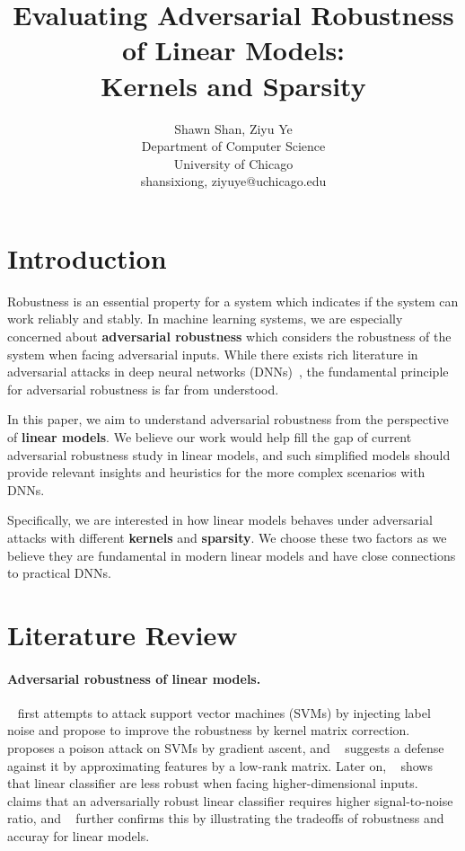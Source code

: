 \documentclass{article}
\title{Evaluating Adversarial Robustness of Linear Models:\\Kernels and Sparsity}
\author{%
  Shawn Shan, Ziyu Ye \\
  Department of Computer Science\\
  University of Chicago\\
  {shansixiong, ziyuye}@uchicago.edu \\
}
\begin{document}
\maketitle


\section{Introduction}
Robustness is an essential property for a system which indicates if the system can work reliably and stably. In machine learning systems, we are especially concerned about \textbf{adversarial robustness} which considers the robustness of the system when facing adversarial inputs. While there exists rich literature in adversarial attacks in deep neural networks (DNNs)~\cite{hao2020adversarial}, the fundamental principle for adversarial robustness is far from understood.

In this paper, we aim to understand adversarial robustness from the perspective of \textbf{linear models}. We believe our work would help fill the gap of current adversarial robustness study in linear models, and such simplified models should provide relevant insights and heuristics for the more complex scenarios with DNNs.

Specifically, we are interested in how linear models behaves under adversarial attacks with different \textbf{kernels} and \textbf{sparsity}. We choose these two factors as we believe they are fundamental in modern linear models and have close connections to practical DNNs.


\section{Literature Review}
\paragraph{Adversarial robustness of linear models.} ~\cite{biggio2011support} first attempts to attack support vector machines (SVMs) by injecting label noise and propose to improve the robustness by kernel matrix correction. ~\cite{bat2012svm} proposes a poison attack on SVMs by gradient ascent, and ~\cite{liu2017robust} suggests a defense against it by approximating features by a low-rank matrix. Later on, ~\cite{megyeri2019adversarial} shows that linear classifier are less robust when facing higher-dimensional inputs. ~\cite{shi2019understanding} claims that an adversarially robust linear classifier requires higher signal-to-noise ratio, and ~\cite{javanmard2020precise} further confirms this by illustrating the tradeoffs of robustness and accuray for linear models.
\end{document}
